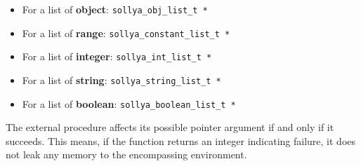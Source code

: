 \begin{itemize}
\begin{itemize}
\begin{itemize}
          \item For a list of \textbf{object}: \verb|sollya_obj_list_t *|
          \item For a list of \textbf{range}: \verb|sollya_constant_list_t *|
          \item For a list of \textbf{integer}: \verb|sollya_int_list_t *|
          \item For a list of \textbf{string}: \verb|sollya_string_list_t *|
          \item For a list of \textbf{boolean}: \verb|sollya_boolean_list_t *| \end{itemize}
   \end{itemize}
   The external procedure affects its possible pointer argument if and only if
   it succeeds. This means, if the function returns an integer indicating
   failure, it does not leak any memory to the encompassing environment.
    

\end{itemize}
